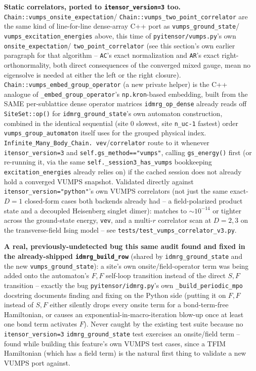\documentclass[11pt]{article}
\begin{document}
\textbf{Static correlators, ported to \texttt{itensor\_version=3} too.}
\texttt{Chain::vumps\_onsite\_expectation}/
\texttt{Chain::vumps\_two\_point\_correlator} are the same kind of
line-for-line dense-array C++ port as \texttt{vumps\_ground\_state}/
\texttt{vumps\_excitation\_energies} above, this time of
\texttt{pyitensor/vumps.py}'s own \texttt{onsite\_expectation}/
\texttt{two\_point\_correlator} (see this section's own earlier
paragraph for that algorithm -- \texttt{AC}'s exact normalization and
\texttt{AR}'s exact right-orthonormality, both direct consequences of the
converged mixed gauge, mean no eigensolve is needed at either the left or
the right closure). \texttt{Chain::vumps\_embed\_group\_operator} (a new
private helper) is the C++ analogue of \texttt{\_embed\_group\_operator}'s
\texttt{np.kron}-based embedding, built from the SAME per-sublattice
dense operator matrices \texttt{idmrg\_op\_dense} already reads off
\texttt{SiteSet::op()} for \texttt{idmrg\_ground\_state}'s own automaton
construction, combined in the identical sequential (site 0 slowest, site
\texttt{n\_uc-1} fastest) order \texttt{vumps\_group\_automaton} itself
uses for the grouped physical index. \texttt{Infinite\_Many\_Body\_Chain.
vev}/\texttt{correlator} route to it whenever \texttt{itensor\_version=3}
and \texttt{self.gs\_method=="vumps"}, calling \texttt{gs\_energy()} first
(or re-running it, via the same \texttt{self.\_session3\_has\_vumps}
bookkeeping \texttt{excitation\_energies} already relies on) if the
cached session does not already hold a converged VUMPS snapshot.
Validated directly against \texttt{itensor\_version="python"}'s own VUMPS
correlators (not just the same exact-$D=1$ closed-form cases both
backends already had -- a field-polarized product state and a decoupled
Heisenberg singlet dimer): matches to $\sim10^{-14}$ or tighter across
the ground-state energy, \texttt{vev}, and a multi-$r$ correlator scan at
$D=2,3$ on the transverse-field Ising model -- see
\texttt{tests/test\_vumps\_correlator\_v3.py}.

\textbf{A real, previously-undetected bug this same audit found and
fixed in the already-shipped \texttt{idmrg\_build\_row}} (shared by
\texttt{idmrg\_ground\_state} and the new \texttt{vumps\_ground\_state}):
a site's own onsite/field-operator term was being added onto the
automaton's $F,F$ self-loop transition instead of the direct $S,F$
transition -- exactly the bug \texttt{pyitensor/idmrg.py}'s own
\texttt{\_build\_periodic\_mpo} docstring documents finding and fixing
on the Python side (putting it on $F,F$ instead of $S,F$ either
silently drops every onsite term for a bond-term-free Hamiltonian, or
causes an exponential-in-macro-iteration blow-up once at least one bond
term activates $F$). Never caught by the existing test suite because no
\texttt{itensor\_version=3} \texttt{idmrg\_ground\_state} test exercises
an onsite/field term -- found while building this feature's own VUMPS
test cases, since a TFIM Hamiltonian (which has a field term) is the
natural first thing to validate a new VUMPS port against.
\end{document}
